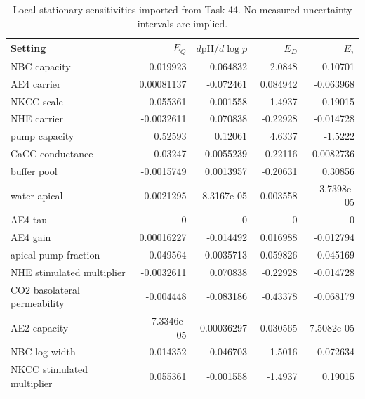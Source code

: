 \begin{table}[tbp]
\centering\small
\begin{tabular}{p{}rrrr}
\toprule Setting & $E_Q$ & $d\mathrm{pH}/d\log p$ & $E_D$ & $E_{\tau}$ \\ \midrule
NBC capacity & 0.019923 & 0.064832 & 2.0848 & 0.10701 \\
AE4 carrier & 0.00081137 & -0.072461 & 0.084942 & -0.063968 \\
NKCC scale & 0.055361 & -0.001558 & -1.4937 & 0.19015 \\
NHE carrier & -0.0032611 & 0.070838 & -0.22928 & -0.014728 \\
pump capacity & 0.52593 & 0.12061 & 4.6337 & -1.5222 \\
CaCC conductance & 0.03247 & -0.0055239 & -0.22116 & 0.0082736 \\
buffer pool & -0.0015749 & 0.0013957 & -0.20631 & 0.30856 \\
water apical & 0.0021295 & -8.3167e-05 & -0.003558 & -3.7398e-05 \\
AE4 tau & 0 & 0 & 0 & 0 \\
AE4 gain & 0.00016227 & -0.014492 & 0.016988 & -0.012794 \\
apical pump fraction & 0.049564 & -0.0035713 & -0.059826 & 0.045169 \\
NHE stimulated multiplier & -0.0032611 & 0.070838 & -0.22928 & -0.014728 \\
CO2 basolateral permeability & -0.004448 & -0.083186 & -0.43378 & -0.068179 \\
AE2 capacity & -7.3346e-05 & 0.00036297 & -0.030565 & 7.5082e-05 \\
NBC log width & -0.014352 & -0.046703 & -1.5016 & -0.072634 \\
NKCC stimulated multiplier & 0.055361 & -0.001558 & -1.4937 & 0.19015 \\
\bottomrule\end{tabular}
\caption{Local stationary sensitivities imported from Task 44. No measured uncertainty intervals are implied.}
\end{table}
